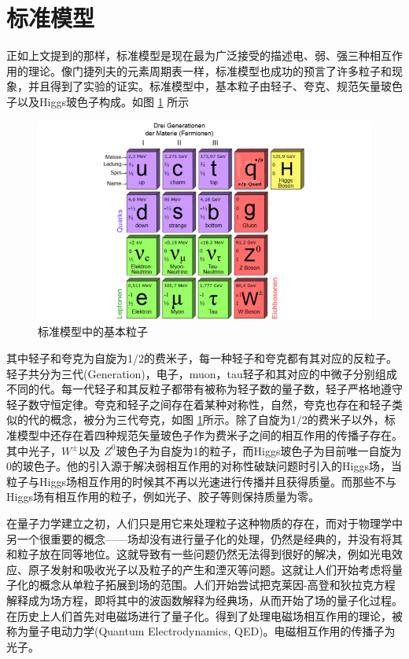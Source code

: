 \section{标准模型}

正如上文提到的那样，标准模型是现在最为广泛接受的描述电、弱、强三种相互作用的理论。像门捷列夫的元素周期表一样，标准模型也成功的预言了许多粒子和现象，并且得到了实验的证实。标准模型中，基本粒子由轻子、夸克、规范矢量玻色子以及Higgs玻色子构成。如图 \ref{fig:ParticleTable} 所示
\begin{figure}[htb]
    \begin{center}
    \includegraphics[width=\textwidth,clip]{figures/Chapter1/ParticleTable.png}
    \end{center}
    \caption[标准模型中的基本粒子]{标准模型中的基本粒子}
    \label{fig:ParticleTable}
\end{figure}
其中轻子和夸克为自旋为1/2的费米子，每一种轻子和夸克都有其对应的反粒子。轻子共分为三代(Generation)，电子，muon，tau轻子和其对应的中微子分别组成不同的代。每一代轻子和其反粒子都带有被称为轻子数的量子数，轻子严格地遵守轻子数守恒定律。夸克和轻子之间存在着某种对称性，自然，夸克也存在和轻子类似的代的概念，被分为三代夸克，如图 \ref{fig:ParticleTable}所示。除了自旋为1/2的费米子以外，标准模型中还存在着四种规范矢量玻色子作为费米子之间的相互作用的传播子存在。其中光子，$W^{\pm}$以及 $Z^0$玻色子为自旋为1的粒子，而Higgs玻色子为目前唯一自旋为0的玻色子。他的引入源于解决弱相互作用的对称性破缺问题时引入的Higgs场，当粒子与Higgs场相互作用的时候其不再以光速进行传播并且获得质量。而那些不与Higgs场有相互作用的粒子，例如光子、胶子等则保持质量为零。

在量子力学建立之初，人们只是用它来处理粒子这种物质的存在，而对于物理学中另一个很重要的概念——场却没有进行量子化的处理，仍然是经典的，并没有将其和粒子放在同等地位。这就导致有一些问题仍然无法得到很好的解决，例如光电效应、原子发射和吸收光子以及粒子的产生和湮灭等问题。这就让人们开始考虑将量子化的概念从单粒子拓展到场的范围。人们开始尝试把克莱因-高登和狄拉克方程解释成为场方程，即将其中的波函数解释为经典场，从而开始了场的量子化过程。在历史上人们首先对电磁场进行了量子化。得到了处理电磁场相互作用的理论，被称为量子电动力学(Quantum Electrodynamics, QED)。电磁相互作用的传播子为光子。

